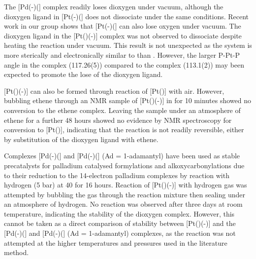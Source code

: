 The [Pd(-)(] complex readily loses dioxygen under vacuum, although the dioxygen ligand in [Pt(-)(] does not dissociate under the same conditions.\cite{Yoshida1979}  Recent work in our group shows that [Pt(-)(] can also lose oxygen under vacuum.\cite{Kathrynthesis, Rosieunpublished}  The dioxygen ligand in the [Pt(\tButhixantphos)(-)] complex was not observed to dissociate despite heating the reaction under vacuum.  This result is not unexpected as the \tButhixantphos{} system is more sterically and electronically similar to  than .  However, the larger P-Pt-P angle in the \tButhixantphos{} complex (117.26(5)\degrees) compared to the  complex (113.1(2)\degrees) may been expected to promote the lose of the dioxygen ligand.\cite{Yoshida1979}  

[Pt(\tButhixantphos)(-)] can also be formed through reaction of [Pt(\tButhixantphos)] with air.  However, bubbling ethene through an NMR sample of [Pt(\tButhixantphos)(-)] in  for 10 minutes showed no conversion to the ethene complex.  Leaving the sample under an atmosphere of ethene for a further 48 hours showed no evidence by NMR spectroscopy for conversion to [Pt(\tButhixantphos)], indicating that the reaction is not readily reversible, either by substitution of the dioxygen ligand with ethene.  

Complexes [Pd(-)(] and [Pd(-)(] (Ad = 1-adamantyl) have been used as stable precatalysts for palladium catalysed formylations and alkoxycarbonylations due to their reduction to the 14-electron palladium complexes by reaction with hydrogen (5 bar) at 40\degC{} for 16 hours.\cite{Sergeev2010}  Reaction of [Pt(\tButhixantphos)(-)] with hydrogen gas was attempted by bubbling the gas through the reaction mixture then sealing under an atmosphere of hydrogen.  No reaction was observed after three days at room temperature, indicating the stability of the dioxygen complex.  However, this cannot be taken as a direct comparison of stability between [Pt(\tButhixantphos)(-)] and the [Pd(-)(] and [Pd(-)(] (Ad = 1-adamantyl) complexes, as the reaction was not attempted at the higher temperatures and pressures used in the literature method.\cite{Sergeev2010}

